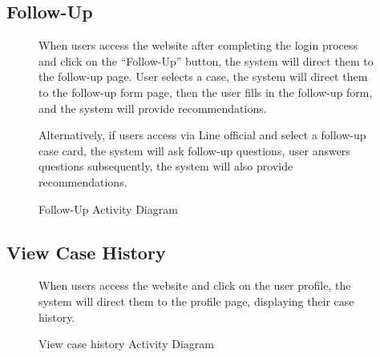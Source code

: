 \documentclass[12pt,oneside,openright,a4paper]{cpe-english-project}
\begin{document}
      \subsection{Follow-Up}
      \begin{figure}[H]
        \centering
        \caption{Follow-Up Activity Diagram}\label{fig:AD_Follow}
        \begin{justify}
          \qquad When users access the website after completing the login process and click on the “Follow-Up” button, the system will direct them to the follow-up page. User selects a case, the system will direct them to the follow-up form page, then the user fills in the follow-up form, and the system will provide recommendations.\par
          \qquad Alternatively, if users access via Line official and select a follow-up case card, the system will ask follow-up questions, user answers questions subsequently, the system will also provide recommendations. \par
        \end{justify}
      \end{figure}
\newpage
      \subsection{View Case History}
      \begin{figure}[H]
        \centering
        \caption{View case history Activity Diagram}\label{fig:AD_ViewCase}
        \begin{justify}
          \qquad When users access the website and click on the user profile, the system will direct them to the profile page, displaying their case history.  \par
        \end{justify}
      \end{figure}
\end{document}
